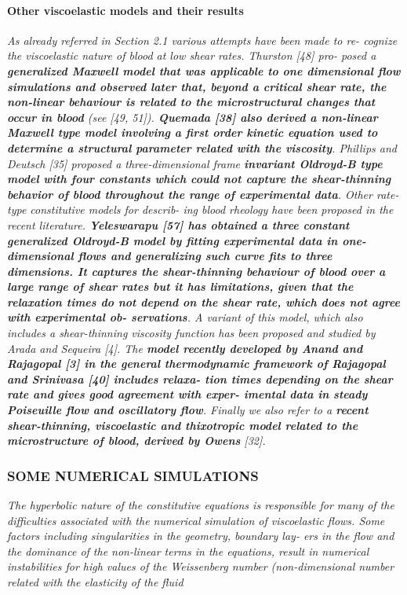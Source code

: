 \documentclass[11pt,letterpaper]{article}
\begin{document}
\paragraph{Other viscoelastic models and their results}\textit{As already referred in Section 2.1 various attempts have been made to re-
cognize the viscoelastic nature of blood at low shear rates. Thurston [48] pro- posed a \textbf{generalized Maxwell model that was applicable to one dimensional flow simulations and observed later that, beyond a critical shear rate, the non-linear behaviour is related to the microstructural changes that occur in blood} (see [49, 51]). \textbf{Quemada [38] also derived a non-linear Maxwell type model involving a first order kinetic equation used to determine a structural parameter related with the viscosity}. Phillips and Deutsch [35] proposed a three-dimensional frame \textbf{invariant Oldroyd-B type model with four constants which could not capture the shear-thinning behavior of blood throughout the range of experimental data}. Other rate-type constitutive models for describ- ing blood rheology have been proposed in the recent literature. \textbf{Yeleswarapu [57] has obtained a three constant generalized Oldroyd-B model by fitting experimental data in one-dimensional flows and generalizing such curve fits to three dimensions. It captures the shear-thinning behaviour of blood over a large range of shear rates but it has limitations, given that the relaxation times do not depend on the shear rate, which does not agree with experimental ob- servations}. A variant of this model, which also includes a shear-thinning viscosity function has been proposed and studied by Arada and Sequeira [4]. The \textbf{model recently developed by Anand and Rajagopal [3] in the general thermodynamic framework of Rajagopal and Srinivasa [40] includes relaxa- tion times depending on the shear rate and gives good agreement with exper- imental data in steady Poiseuille flow and oscillatory flow}. Finally we also refer to a \textbf{recent shear-thinning, viscoelastic and thixotropic model related to the microstructure of blood, derived by Owens }[32].}

\subsubsection*{SOME NUMERICAL SIMULATIONS}
\textit{The hyperbolic nature of the constitutive equations is responsible for many of the difficulties associated with the numerical simulation of viscoelastic flows. Some factors including singularities in the geometry, boundary lay- ers in the flow and the dominance of the non-linear terms in the equations, result in numerical instabilities for high values of the Weissenberg number (non-dimensional number related with the elasticity of the fluid}
\end{document}
